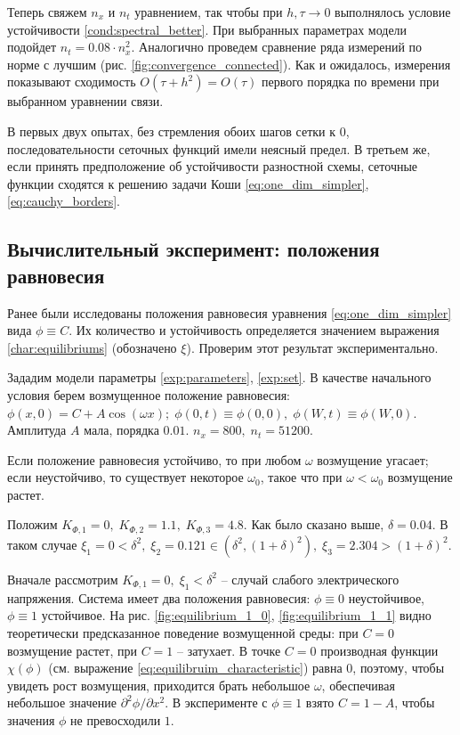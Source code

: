 Теперь свяжем $n_x$ и $n_t$ уравнением, так чтобы при $h, \tau \to 0$ выполнялось условие устойчивости \eqref{cond:spectral_better}. При выбранных параметрах модели подойдет $n_t = 0.08 \cdot n_x^2$. Аналогично проведем сравнение ряда измерений по норме с лучшим (рис. \ref{fig:convergence_connected}). Как и ожидалось, измерения показывают сходимость $O(\tau + h^2) = O(\tau)$ первого порядка по времени при выбранном уравнении связи.

В первых двух опытах, без стремления обоих шагов сетки к $0$, последовательности сеточных функций имели неясный предел. В третьем же, если принять предположение об устойчивости разностной схемы, сеточные функции сходятся к решению задачи Коши \eqref{eq:one_dim_simpler}, \eqref{eq:cauchy_borders}.


\subsection{Вычислительный эксперимент: положения равновесия}

Ранее были исследованы положения равновесия уравнения \eqref{eq:one_dim_simpler} вида $\phi \equiv C$. Их количество и устойчивость определяется значением выражения \eqref{char:equilibriums} (обозначено $\xi$). Проверим этот результат экспериментально.

Зададим модели параметры \eqref{exp:parameters}, \eqref{exp:set}. В качестве начального условия берем возмущенное положение равновесия: $\phi(x, 0) = C + A \cos(\omega x); \; \phi(0, t) \equiv \phi(0, 0), \; \phi(W, t) \equiv \phi(W, 0)$. Амплитуда $A$ мала, порядка $0.01$. $n_x = 800, \; n_t = 51200$.

Если положение равновесия устойчиво, то при любом $\omega$ возмущение угасает; если неустойчиво, то существует некоторое $\omega_0$, такое что при $\omega < \omega_0$ возмущение растет.

Положим $K_{\Phi, 1} = 0, \; K_{\Phi, 2} = 1.1, \; K_{\Phi, 3} = 4.8$. Как было сказано выше, $\delta = 0.04$. В таком случае $\xi_1 = 0 < \delta^2, \; \xi_2 = 0.121 \in (\delta^2, (1 + \delta)^2), \; \xi_3 = 2.304 > (1 + \delta)^2$.

Вначале рассмотрим $K_{\Phi, 1} = 0, \; \xi_1 < \delta^2$ -- случай слабого электрического напряжения. Система имеет два положения равновесия: $\phi \equiv 0$ неустойчивое, $\phi \equiv 1$ устойчивое. На рис. \ref{fig:equilibrium_1_0}, \ref{fig:equilibrium_1_1} видно теоретически предсказанное поведение возмущенной среды: при $C = 0$ возмущение растет, при $C = 1$ -- затухает. В точке $C = 0$ производная функции $\chi(\phi)$ (см. выражение \eqref{eq:equilibruim_characteristic}) равна $0$, поэтому, чтобы увидеть рост возмущения, приходится брать небольшое $\omega$, обеспечивая небольшое значение $\partial^2 \phi / \partial x^2$. В эксперименте с $\phi \equiv 1$ взято $C = 1 - A$, чтобы значения $\phi$ не превосходили $1$.

